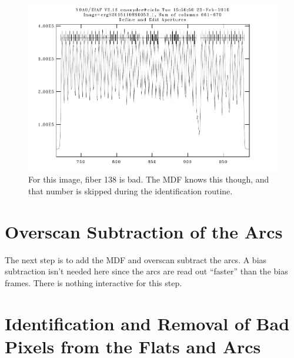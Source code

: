 \documentclass[12pt]{report}
\begin{document}
\begin{figure}[h]
\centering
\includegraphics[scale=0.8]{badfiber}
\caption[Example Image of a Bad Fiber]{For this image, fiber 138 is bad. The MDF knows this though, and that number is skipped during the identification routine.}
\label{fig:bad}
\end{figure}


\section{Overscan Subtraction of the Arcs}

The next step is to add the MDF and overscan subtract the arcs. A bias subtraction isn't needed here since the arcs are read out ``faster'' than the bias frames. There is nothing interactive for this step.

\section{Identification and Removal of Bad Pixels from the Flats and Arcs}
\label{badpix}
\end{document}
